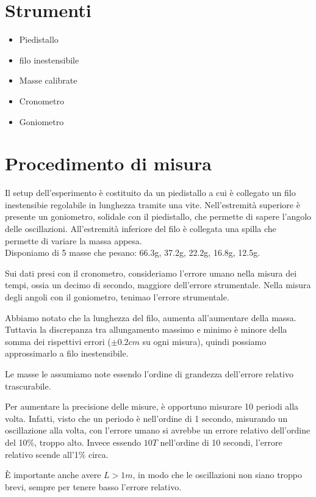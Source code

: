 \documentclass[12pt, a4paper]{article}
\begin{document}
\section{Strumenti}
    \begin{itemize}
        \item Piedistallo 
        \item filo inestensibile
        \item Masse calibrate
        \item Cronometro 
        \item Goniometro 
    \end{itemize}


    
\section{Procedimento di misura}
Il setup dell'esperimento è costituito da un piedistallo a cui è collegato un filo inestensibie regolabile in lunghezza tramite una vite. Nell'estremità superiore è presente un goniometro, solidale con il piedistallo, che permette di sapere l'angolo delle oscillazioni. All'estremità inferiore del filo è collegata una spilla che permette di variare la massa appesa. \\
Disponiamo di 5 masse che pesano: 66.3g, 37.2g, 22.2g, 16.8g, 12.5g.

Sui dati presi con il cronometro, consideriamo l'errore umano nella misura dei tempi, ossia un decimo di secondo, maggiore dell'errore strumentale. 
Nella misura degli angoli con il goniometro, tenimao l'errore strumentale. 

Abbiamo notato che la lunghezza del filo, aumenta all'aumentare della massa. Tuttavia la discrepanza tra allungamento massimo e minimo è minore della somma dei rispettivi errori ($\pm0.2cm$ su ogni misura), quindi possiamo approssimarlo a filo inestensibile.

Le masse le assumiamo note essendo l'ordine di grandezza dell'errore relativo trascurabile.

Per aumentare la precisione delle misure, è opportuno misurare 10 periodi alla volta.
Infatti, visto che un periodo è nell'ordine di 1 secondo, misurando un oscillazione alla volta, con l'errore umano si avrebbe un errore relativo dell'ordine del 10\%, troppo alto.
Invece essendo $10T$ nell'ordine di 10 secondi, l'errore relativo scende all'1\% circa.

È importante anche avere $L > 1m$, in modo che le oscillazioni non siano troppo brevi, sempre per tenere basso l'errore relativo.
\end{document}
